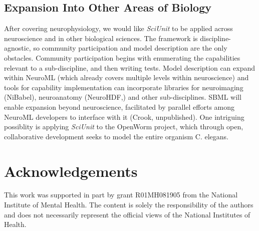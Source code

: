 \documentclass[11pt,letterpaper]{article}
\begin{document}
\subsection{Expansion Into Other Areas of Biology}
After covering neurophysiology, we would like \textit{SciUnit} to be applied across neuroscience and in other biological sciences. 
The framework is discipline-agnostic, so community participation and model description are the only obstacles. 
Community participation begins with enumerating the capabilities relevant to a sub-discipline, and then writing tests. 
Model description can expand within NeuroML (which already covers multiple levels within neuroscience) and tools for capability implementation can incorporate libraries for neuroimaging (NiBabel\cite{nibabel_url}), neuroanatomy (NeuroHDF,\cite{neurohdf_url}) and other sub-disciplines. 
SBML\cite{hucka_systems_2003,sbml_url} will enable expansion beyond neuroscience, facilitated by parallel efforts among NeuroML developers to interface with it (Crook, unpublished). 
One intriguing possiblity is applying \textit{SciUnit} to the OpenWorm project\cite{open_worm_url}, which through open, collaborative development seeks to model the entire organism C. elegans.  

\section{Acknowledgements}
This work was supported in part by grant R01MH081905 from the National Institute of Mental Health. The content is solely the responsibility of the authors and does not necessarily represent the official views of the National Institutes of Health.



\end{document}

